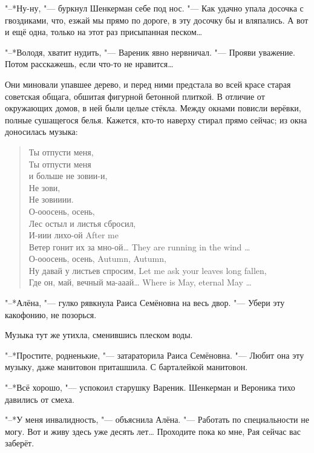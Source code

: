 "--*Ну-ну, "--- буркнул Шенкерман себе под нос.
"--- Как удачно упала досочка с гвоздиками, что, езжай мы прямо по дороге, в эту досочку бы и вляпались.
А вот и ещё одна, только на этот раз присыпанная песком\ldots{}

"--*Володя, хватит нудить, "--- Вареник явно нервничал.
"--- Прояви уважение.
Потом расскажешь, если что-то не нравится\ldots{}

Они миновали упавшее дерево, и перед ними предстала во всей красе старая советская общага, обшитая фигурной бетонной плиткой.
В отличие от окружающих домов, в ней были целые стёкла.
Между окнами повисли верёвки, полные сушащегося белья.
Кажется, кто-то наверху стирал прямо сейчас;
из окна доносилась музыка:

\begin{quote}
Ты отпусти меня,\\
Ты отпусти меня\\
и больше не зовии-и,\\
Не зови,\\
Не зовииии.\\
О-ооосень, осень,\\
Лес остыл и листья сбросил,\\
{И-иии лихо-ой}
{After me}\\
{Ветер гонит их за мно-ой\ldots{}}
{They are running in the wind \ldots{}}\\
{О-ооосень, осень,}
{Autumn, Autumn,}\\
{Ну давай у листьев спросим,}
{Let me ask your leaves long fallen,}\\
{Где он, май, вечный ма-ааай\ldots{}}
{Where is May, eternal May \ldots{}}
\end{quote}

"--*Алёна, "--- гулко рявкнула Раиса Семёновна на весь двор.
"--- Убери эту какофонию, не позорься.

Музыка тут же утихла, сменившись плеском воды.

"--*Простите, родненькие, "--- затараторила Раиса Семёновна.
"--- Любит она эту музыку, даже манитовон приташшила.
С барталейкой манитовон.

"--*Всё хорошо, "--- успокоил старушку Вареник.
Шенкерман и Вероника тихо давились от смеха.

\asterism

\textspace

"--*У меня инвалидность, "--- объяснила Алёна.
"--- Работать по специальности не могу.
Вот и живу здесь уже десять лет\ldots{}
Проходите пока ко мне, Рая сейчас вас заберёт.

